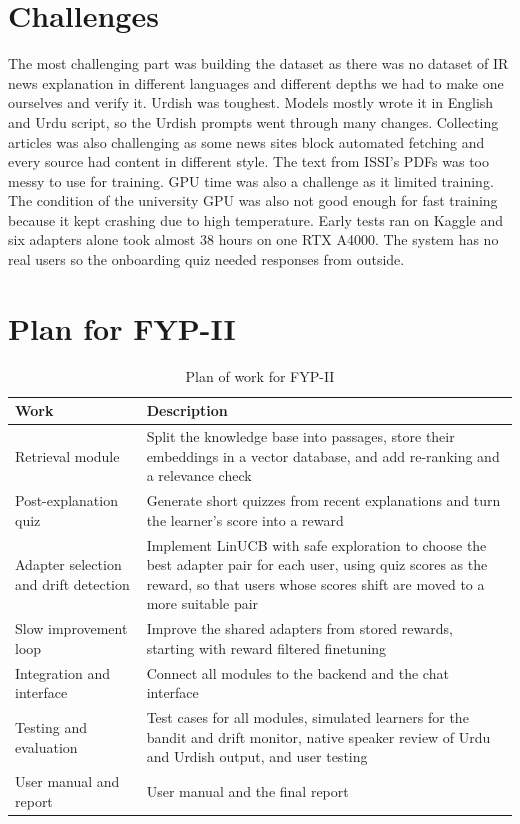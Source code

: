 \documentclass{FastFyp}
\begin{document}
\section{Challenges}

The most challenging part was building the dataset as there was no dataset of IR news explanation in different languages and different depths we had to make one ourselves and verify it. Urdish was toughest. Models mostly wrote it in English and Urdu script, so the Urdish prompts went through many changes. Collecting articles was also challenging as some news sites block automated fetching and every source had content in different style. The text from ISSI's PDFs was too messy to use for training. GPU time was also a challenge as it limited training. The condition of the university GPU was also not good enough for fast training because it kept crashing due to high temperature. Early tests ran on Kaggle and six adapters alone took almost 38 hours on one RTX A4000. The system has no real users so the onboarding quiz needed responses from outside. 

\section{Plan for FYP-II}
\begin{table}[!ht]
\centering
\caption{Plan of work for FYP-II}
\label{tab:fyp2plan}
\begin{tabular}{|p{4cm}|p{10cm}|}
\hline
\textbf{Work} & \textbf{Description} \\ \hline
Retrieval module & Split the knowledge base into passages, store their embeddings in a vector database, and add re-ranking and a relevance check \\ \hline
Post-explanation quiz & Generate short quizzes from recent explanations and turn the learner's score into a reward \\ \hline
Adapter selection and drift detection & Implement LinUCB with safe exploration to choose the best adapter pair for each user, using quiz scores as the reward, so that users whose scores shift are moved to a more suitable pair \\ \hline
Slow improvement loop & Improve the shared adapters from stored rewards, starting with reward filtered finetuning\\ \hline
Integration and interface & Connect all modules to the backend and the chat interface \\ \hline
Testing and evaluation & Test cases for all modules, simulated learners for the bandit and drift monitor, native speaker review of Urdu and Urdish output, and user testing \\ \hline
User manual and report & User manual and the final report \\ \hline
\end{tabular}
\end{table}
\end{document}
